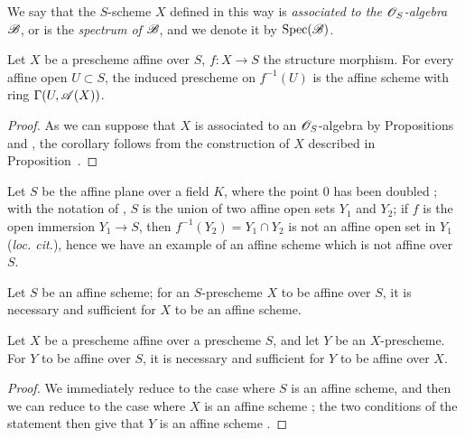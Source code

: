 We say that the $S$-scheme $X$ defined in this way is \emph{associated to the $\mathscr{O}_S$-algebra $\mathscr{B}$}, or is the \emph{spectrum of $\mathscr{B}$}, and we denote it by $\operatorname{Spec}(\mathscr{B})$.

\begin{corollary}[1.3.2]
\label{II.1.3.2}
Let $X$ be a prescheme affine over $S$, $f:X\to S$ the structure morphism.
For every affine open $U\subset S$, the induced prescheme on $f^{-1}(U)$ is the affine scheme with ring $\Gamma(U,\mathscr{A}(X))$.
\end{corollary}

\begin{proof}
As we can suppose that $X$ is associated to an $\mathscr{O}_S$-algebra by Propositions~ and , the corollary follows from the construction of $X$ described in Proposition~.
\end{proof}

\begin{example}[1.3.3]
\label{II.1.3.3}
Let $S$ be the affine plane over a field $K$, where the point $0$ has been doubled ; with the notation of , $S$ is the union of two affine open sets $Y_1$ and $Y_2$; if $f$ is the open immersion $Y_1\to S$, then $f^{-1}(Y_2)=Y_1\cap Y_2$ is not an affine open set in $Y_1$ (\emph{loc. cit.}), hence we have an example of an affine scheme which is not affine over $S$.
\end{example}

\begin{corollary}[1.3.4]
\label{II.1.3.4}
Let $S$ be an affine scheme; for an $S$-prescheme $X$ to be affine over $S$, it is necessary and sufficient for $X$ to be an affine scheme.
\end{corollary}

\begin{corollary}[1.3.5]
\label{II.1.3.5}
Let $X$ be a prescheme affine over a prescheme $S$, and let $Y$ be an $X$-prescheme.
For $Y$ to be affine over $S$, it is necessary and sufficient for $Y$ to be affine over $X$.
\end{corollary}

\begin{proof}
We immediately reduce to the case where $S$ is an affine scheme, and then we can reduce to the case where $X$ is an affine scheme ; the two conditions of the statement then give that $Y$ is an affine scheme .
\end{proof}

